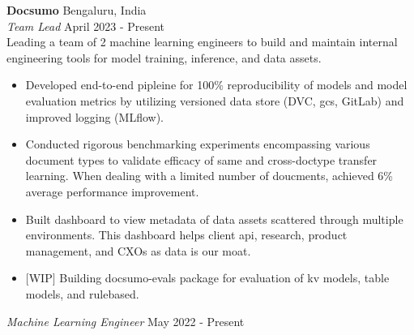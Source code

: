 \documentclass[a4paper]{article}
\begin{document}
\textbf{Docsumo} \hfill Bengaluru, India\\
\textit{Team Lead} \hfill April 2023 - Present\\
\vspace{-1mm}
{Leading a team of 2 machine learning engineers to build and maintain internal engineering tools for model training, inference, and data assets.}
\begin{itemize} \itemsep 0pt
	\item Developed end-to-end pipleine for 100\% reproducibility of models and model evaluation metrics by utilizing versioned data store (DVC, gcs, GitLab) and improved logging (MLflow).
    \item Conducted rigorous benchmarking experiments encompassing various document types to validate efficacy of same and cross-doctype transfer learning. When dealing with a limited number of doucments, achieved 6\% average performance improvement.
    \item Built dashboard to view metadata of data assets scattered through multiple environments. This dashboard helps client api, research, product management, and CXOs as data is our moat.
    \item $[$WIP$]$ Building docsumo-evals package for evaluation of kv models, table models, and rulebased.

\end{itemize}
\textit{Machine Learning Engineer} \hfill May 2022 - Present\\
\vspace{-1mm}
\end{document}
